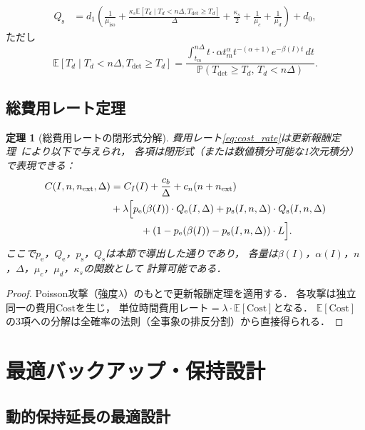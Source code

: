 \documentclass[12pt,a4paper]{article}
\theoremstyle{plain}
\newtheorem{theorem}{定理}[section]
\theoremstyle{definition}
\theoremstyle{remark}
\newcommand{\E}{\mathbb{E}}
\newcommand{\Prob}{\mathbb{P}}
\newcommand{\pe}{p_{\mathrm{e}}}
\newcommand{\ps}{p_{\mathrm{s}}}
\newcommand{\Qe}{Q_{\mathrm{e}}}
\newcommand{\Qs}{Q_{\mathrm{s}}}
\newcommand{\betaI}{\beta(I)}
\begin{document}
\begin{align}
  \Qs
  &= d_1\left(
    \frac{1}{\mu_{\mathrm{iso}}} + \frac{\kappa_s\E[T_d\mid T_d<n\Delta,T_{\mathrm{det}}\ge T_d]}{\Delta}
    + \frac{\kappa_s}{2}
    + \frac{1}{\mu_c}+\frac{1}{\mu_d}
  \right) + d_0, \label{eq:Qs}
\end{align}
ただし
\[
  \E[T_d\mid T_d<n\Delta,T_{\mathrm{det}}\ge T_d]
  = \frac{\int_{t_m}^{n\Delta}t\cdot\alpha t_m^\alpha t^{-(\alpha+1)}e^{-\betaI t}\,dt}
  {\Prob(T_{\mathrm{det}}\ge T_d,\,T_d<n\Delta)}.
\]

\subsection{総費用レート定理}

\begin{theorem}[総費用レートの閉形式分解]\label{thm:cost_rate}
費用レート\eqref{eq:cost_rate}は更新報酬定理~\cite{ross2014}により以下で与えられ，
各項は閉形式（または数値積分可能な1次元積分）で表現できる：
\begin{align}
  C(I,n,n_{\mathrm{ext}},\Delta)
  &= C_I(I) + \frac{c_b}{\Delta} + c_n(n+n_{\mathrm{ext}}) \notag\\
  &+ \lambda\Bigl[
    \pe(\betaI)\cdot\Qe(I,\Delta)
    + \ps(I,n,\Delta)\cdot\Qs(I,n,\Delta) \notag\\
  &\qquad\quad+ (1-\pe(\betaI)-\ps(I,n,\Delta))\cdot L
  \Bigr]. \label{eq:full_cost}
\end{align}
ここで$\pe$，$\Qe$，$\ps$，$\Qs$は本節で導出した通りであり，
各量は$\betaI$，$\alpha(I)$，$n$，$\Delta$，$\mu_c$，$\mu_d$，$\kappa_s$の関数として
計算可能である．
\end{theorem}

\begin{proof}
Poisson攻撃（強度$\lambda$）のもとで更新報酬定理を適用する．
各攻撃は独立同一の費用$\text{Cost}$を生じ，
単位時間費用レート$=\lambda\cdot\E[\text{Cost}]$となる．
$\E[\text{Cost}]$の3項への分解は全確率の法則（全事象の排反分割）から直接得られる．
\end{proof}

\section{最適バックアップ・保持設計}
\label{sec:opt}

\subsection{動的保持延長の最適設計}
\end{document}
